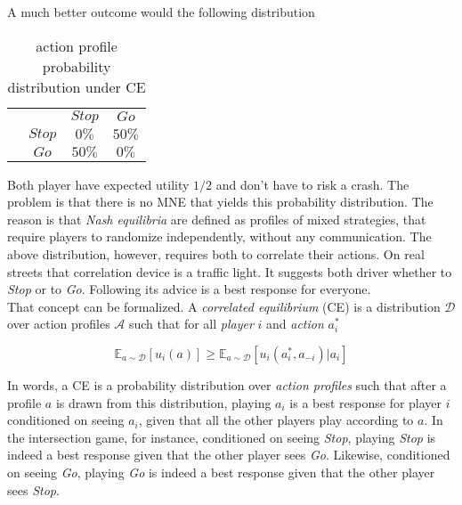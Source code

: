 A much better outcome would the following distribution

\begin{table}[H]\centering
\setlength{\extrarowheight}{2pt}
\begin{tabular}{cc|c|c|}
  & \multicolumn{1}{c}{} & \multicolumn{1}{c}{$Stop$}  & \multicolumn{1}{c}{$Go$} \\\cline{3-4}
  & $Stop$ & $0\%$ & $50\%$ \\\cline{3-4}
  & $Go$ & $50\%$ & $0\%$ \\\cline{3-4}
\end{tabular}\caption{\label{tab:probabilityUnderCE}action profile probability distribution under CE}
\end{table}

Both player have expected utility $1/2$ and don't have to risk a crash. The problem is that there is no MNE that yields this probability distribution. The reason is that \textit{Nash equilibria} are defined as profiles of mixed strategies, that require players to randomize independently, without any
communication. The above distribution, however, requires both to correlate their actions. On real streets that correlation device is a traffic light. It suggests both driver whether to \textit{Stop} or to \textit{Go}. Following its advice is a best response for everyone. \\

That concept can be formalized. A \textit{correlated equilibrium} (CE) is a distribution $\mathcal{D}$ over action profiles $\mathcal{A}$ such that for all \textit{player} $i$ and \textit{action} $a_{i}^{*}$

\begin{equation*}
    \mathbb{E}_{a \sim \mathcal{D}}[u_i(a)] \ge \mathbb{E}_{a \sim \mathcal{D}}[u_i(a_{i}^{*},a_{-i})|a_i]
\end{equation*}

In words, a CE is a probability distribution over \textit{action profiles} such that after a profile $a$ is drawn from this distribution, playing $a_i$ is a best response for player $i$ conditioned on seeing $a_i$, given that all the other players play according to $a$. In the intersection game, for instance, conditioned on seeing \textit{Stop}, playing \textit{Stop} is indeed a best response given that the other player sees \textit{Go}. Likewise, conditioned on seeing \textit{Go}, playing \textit{Go} is indeed a best response given that the other player sees \textit{Stop}. \\

